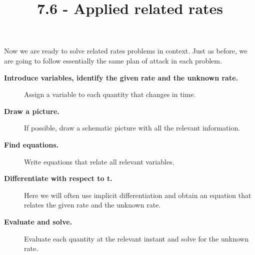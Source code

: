 \documentclass{ximera}
\title{7.6 - Applied related rates}
\begin{document}
	\begin{abstract}

	\end{abstract}
	\maketitle
	
	Now we are ready to solve related rates problems in context. Just as
	before, we are going to follow essentially the same plan of attack in
	each problem.
	
	
	\begin{description}
		\item[\textbf{Introduce variables, identify the given rate and the unknown rate.}] Assign a variable to each quantity that changes in time.
		\item[\textbf{Draw a picture.}] If possible, draw a schematic picture with all the relevant information. 
		\item[\textbf{Find equations.}] Write equations that relate all
		relevant variables.
		\item[\textbf{Differentiate with respect to t.}] Here we will often use
		implicit differentiation and obtain an equation that relates the given rate and the unknown rate. 
		\item[\textbf{Evaluate and solve.}] Evaluate
		each quantity at the relevant instant and solve for the unknown rate.
		
	\end{description}
	
	
	
	
\end{document}
